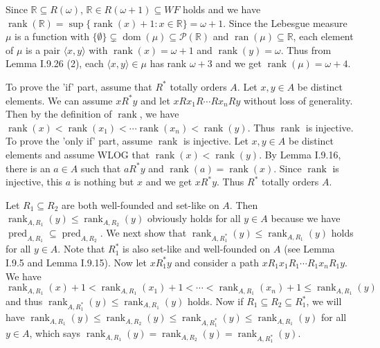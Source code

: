 \documentclass[12pt]{article}
\newcommand{\dom}{\mathop{\mathrm{dom}}}
\newcommand{\ran}{\mathop{\mathrm{ran}}}
\newcommand{\pred}{\mathop{\mathrm{pred}}}
\newcommand{\rank}{\mathop{\mathrm{rank}}}
\theoremstyle{definition}
\newenvironment{customthm}[1]
  {\renewcommand\theinnercustomthm{#1}\innercustomthm}
  {\endinnercustomthm}
\begin{document}
\begin{customthm}{I.9.27}
  Since $\mathbb{R}\subseteq R(\omega)$, $\mathbb{R}\in R(\omega+1)\subseteq WF$ holds and we have $\rank(\mathbb{R})=\sup\{\rank(x)+1:x\in\mathbb{R}\}=\omega+1$. Since the Lebesgue measure $\mu$ is a function with $\{\emptyset\}\subsetneq\dom(\mu)\subseteq\mathcal{P}(\mathbb{R})$ and $\ran(\mu)\subseteq\mathbb{R}$, each element of $\mu$ is a pair $\langle x,y\rangle$ with $\rank(x)=\omega+1$ and $\rank(y)=\omega$. Thus from Lemma I.9.26 (2), each $\langle x,y\rangle\in\mu$ has rank $\omega+3$ and we get $\rank(\mu)=\omega+4$.
\end{customthm}

\begin{customthm}{I.9.39}
  To prove the 'if' part, assume that $R^*$ totally orders $A$. Let $x,y\in A$ be distinct elements. We can assume $xR^*y$ and let $xRx_1R\cdots Rx_nRy$ without loss of generality. Then by the definition of $\rank$, we have $\rank(x)<\rank(x_1)<\cdots\rank(x_n)<\rank(y)$. Thus $\rank$ is injective. To prove the 'only if' part, assume $\rank$ is injective. Let $x,y\in A$ be distinct elements and assume WLOG that $\rank(x)<\rank(y)$. By Lemma I.9.16, there is an $a\in A$ such that $aR^*y$ and $\rank(a)=\rank(x)$. Since $\rank$ is injective, this $a$ is nothing but $x$ and we get $xR^*y$. Thus $R^*$ totally orders $A$.
\end{customthm}

\begin{customthm}{I.9.40}
  Let $R_1\subseteq R_2$ are both well-founded and set-like on $A$. Then $\rank_{A,R_1}(y)\leq\rank_{A,R_2}(y)$ obviously holds for all $y\in A$ because we have $\pred_{A,R_1}\subseteq\pred_{A,R_2}$. We next show that $\rank_{A,R_1^*}(y)\leq\rank_{A,R_1}(y)$ holds for all $y\in A$. Note that $R_1^*$ is also set-like and well-founded on $A$ (see Lemma I.9.5 and Lemma I.9.15). Now let $xR_1^*y$ and consider a path $xR_1x_1R_1\cdots R_1x_nR_1y$. We have $\rank_{A,R_1}(x)+1<\rank_{A,R_1}(x_1)+1<\cdots<\rank_{A,R_1}(x_n)+1\leq\rank_{A,R_1}(y)$ and thus $\rank_{A,R_1^*}(y)\leq\rank_{A,R_1}(y)$ holds. Now if $R_1\subseteq R_2\subseteq R_1^*$, we will have $\rank_{A,R_1}(y)\leq\rank_{A,R_2}(y)\leq\rank_{A,R_1^*}(y)\leq\rank_{A,R_1}(y)$ for all $y\in A$, which says $\rank_{A,R_1}(y)=\rank_{A,R_2}(y)=\rank_{A,R_1^*}(y)$.
\end{customthm}
\end{document}
